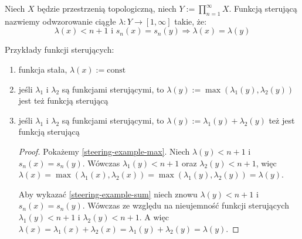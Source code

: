 \begin{df}
Niech $X$ będzie przestrzenią topologiczną, niech $Y := \prod_{n=1}^\infty X$. Funkcją sterującą nazwiemy odwzorowanie ciągłe $\lambda: Y \rightarrow [1,\infty]$ takie, że:
\[\lambda(x) < n+1 \mbox{ i } s_n(x) = s_n(y) \Rightarrow \lambda(x) = \lambda(y)\]
\end{df}

\begin{note} \label{note:steering-example}
Przykłady funkcji sterujących:
  \begin{enumerate}
    \item \label{steering-example-const} funkcja stała, $\lambda(x) := \mbox{const}$
    \item \label{steering-example-max} jeśli $\lambda_1$ i $\lambda_2$ są funkcjami sterującymi, to $\lambda(y) := \max(\lambda_1(y), \lambda_2(y))$ jest też funkcją sterującą
    \item \label{steering-example-sum} jeśli $\lambda_1$ i $\lambda_2$ są funkcjami sterującymi, to $\lambda(y) := \lambda_1(y) + \lambda_2(y)$ też jest funkcją sterującą
  \begin{proof}
     Pokażemy \ref{steering-example-max}. Niech $\lambda(y) < n+1$ i $s_n(x) = s_n(y)$. Wówczas $\lambda_1(y) < n+1$ oraz $\lambda_2(y) < n+1$, więc $\lambda(x) = \max(\lambda_1(x), \lambda_2(x)) = \max(\lambda_1(y), \lambda_2(y)) = \lambda(y)$.
     
     Aby wykazać \ref{steering-example-sum} niech znowu $\lambda(y) < n+1$ i $s_n(x) = s_n(y)$. Wówczas ze względu na nieujemność funkcji sterujących $\lambda_1(y) < n+1$ i $\lambda_2(y) < n+1$. A więc $\lambda(x) = \lambda_1(x) + \lambda_2(x) = \lambda_1(y) + \lambda_2(y) = \lambda(y)$.
  \end{proof}
  \end{enumerate}
\end{note}


